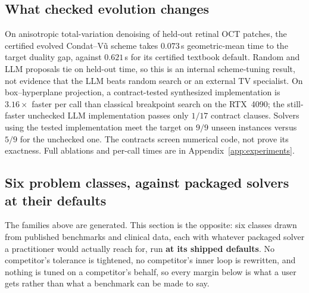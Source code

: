 \subsection{What checked evolution changes}
\label{sec:exp:evolve}
\label{sec:results}
On anisotropic total-variation denoising of held-out retinal OCT patches, the certified evolved Condat--V\~u scheme takes $0.073$\,s geometric-mean time to the target duality gap, against $0.621$\,s for its certified textbook default. Random and LLM proposals tie on held-out time, so this is an internal scheme-tuning result, not evidence that the LLM beats random search or an external TV specialist. On box--hyperplane projection, a contract-tested synthesized implementation is $3.16\times$ faster per call than classical breakpoint search on the RTX~4090; the still-faster unchecked LLM implementation passes only $1/17$ contract clauses. Solvers using the tested implementation meet the target on $9/9$ unseen instances versus $5/9$ for the unchecked one. The contracts screen numerical code, not prove its exactness. Full ablations and per-call times are in Appendix~\ref{app:experiments}.

\subsection{Six problem classes, against packaged solvers at their defaults}
\label{sec:exp:regimes}

The families above are generated. This section is the opposite: six classes
drawn from published benchmarks and clinical data, each with whatever
packaged solver a practitioner would actually reach for, run \textbf{at its
shipped defaults}. No competitor's tolerance is tightened, no competitor's
inner loop is rewritten, and nothing is tuned on a competitor's behalf, so
every margin below is what a user gets rather than what a benchmark can be
made to say.

